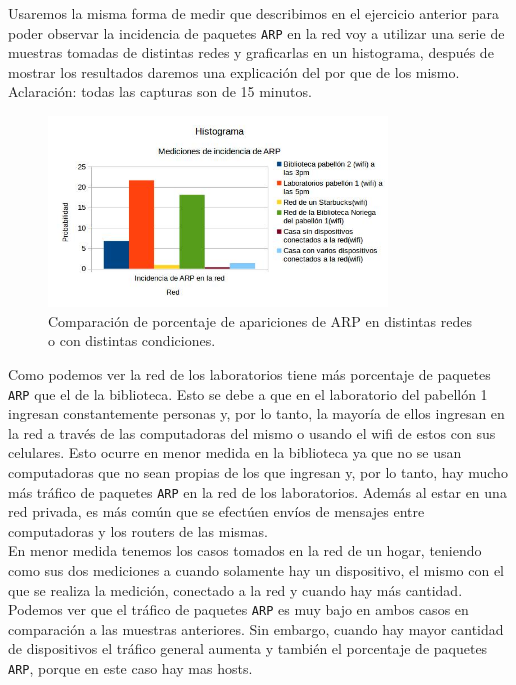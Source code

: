 Usaremos la misma forma de medir que describimos en el ejercicio anterior para poder observar la incidencia de paquetes \texttt{ARP} en la red voy a utilizar una serie de muestras
tomadas de distintas redes y graficarlas en un histograma, después de mostrar los resultados daremos una explicación del por que de los mismo. Aclaración: todas las capturas
son de 15 minutos.

\begin{figure}[H]
\centering
\includegraphics[width=90mm]{imagenes/IncidenciaARP.jpg}
\caption{Comparación de porcentaje de apariciones de ARP en distintas redes o con distintas condiciones.\label{overflow}}
\end{figure}

Como podemos ver la red de los laboratorios tiene más porcentaje de paquetes \texttt{ARP} que el de la biblioteca. Esto se debe a que en el laboratorio del pabellón 1 ingresan
constantemente personas y, por lo tanto, la mayoría de ellos ingresan en la red a través de las computadoras del mismo o usando el wifi de estos con sus celulares. Esto
ocurre en menor medida en la biblioteca ya que no se usan computadoras que no sean propias de los que ingresan y, por lo tanto, hay mucho más tráfico de paquetes \texttt{ARP} en la red
de los laboratorios. Además al estar en una red privada, es más común que se efectúen envíos de mensajes entre computadoras y los routers de las mismas.\\

En menor medida tenemos los casos tomados en la red de un hogar, teniendo como sus dos mediciones a cuando solamente hay un dispositivo, el mismo con el que se realiza la medición,
conectado a la red y cuando hay más cantidad. Podemos ver que el tráfico de paquetes \texttt{ARP} es muy bajo en ambos casos en comparación a las muestras anteriores. Sin embargo,
cuando hay mayor cantidad de dispositivos el tráfico general aumenta y también el porcentaje de paquetes \texttt{ARP}, porque en este caso hay mas hosts.\\

